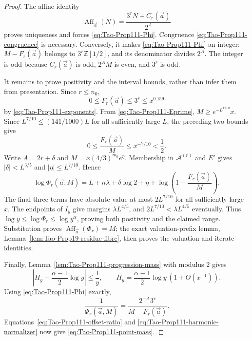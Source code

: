 \begin{proof}
The affine identity
\[
 \operatorname{Aff}_{\vec a}(N)=\frac{3^rN+C_r(\vec a)}{2^A}
\]
proves uniqueness and forces \eqref{eq:Tao-Prop111-Phi}.  Congruence
\eqref{eq:Tao-Prop111-congruence} is necessary.  Conversely, it makes
\eqref{eq:Tao-Prop111-Phi} an integer: \(M-F_r(\vec a)\) belongs to
\(3^r\mathbb Z[1/2]\), and its denominator divides \(2^A\).  The integer is
odd because \(C_r(\vec a)\) is odd, \(2^AM\) is even, and \(3^r\) is odd.

It remains to prove positivity and the interval bounds, rather than infer
them from presentation.  Since \(r\le n_0\),
\[
 0\le F_r(\vec a)\le3^r\le x^{0.159}
\]
by \eqref{eq:Tao-Prop111-exponents}.  From \eqref{eq:Tao-Prop111-Eprime},
\(M\ge e^{-L^{7/10}}x\).  Since
\(L^{7/10}\le(141/1000)L\) for all sufficiently large \(L\), the preceding
two bounds give
\begin{equation}
\label{eq:Tao-Prop111-offset-ratio}
 0\le\frac{F_r(\vec a)}M\le x^{-7/10}<\frac12.
\end{equation}
Write \(A=2r+\delta\) and
\(M=x(4/3)^{m_0}e^\eta\).  Membership in
\(\mathcal A^{(r)}\) and \(E'\) gives
\(|\delta|<L^{3/5}\) and \(|\eta|\le L^{7/10}\).  Hence
\begin{equation}
\label{eq:Tao-Prop111-Phi-log}
 \log\Phi_r(\vec a,M)
 =L+n\lambda+\delta\log2+\eta+
   \log\left(1-\frac{F_r(\vec a)}M\right).
\end{equation}
The final three terms have absolute value at most \(2L^{7/10}\) for all
sufficiently large \(x\).  The endpoints of \(I_y\) give margins
\(\lambda L^{4/5}\), and
\(2L^{7/10}<\lambda L^{4/5}\) eventually.  Thus
\(\log y\le\log\Phi_r\le\log y^\alpha\), proving both positivity and the
claimed range.  Substitution proves
\(\operatorname{Aff}_{\vec a}(\Phi_r)=M\); the exact valuation-prefix lemma,
Lemma~\ref{lem:Tao-Prop19-residue-fibre}, then proves the valuation and
iterate identities.

Finally, Lemma~\ref{lem:Tao-Prop111-progression-mass} with modulus \(2\)
gives
\begin{equation}
\label{eq:Tao-Prop111-harmonic-normalizer}
 \left|H_y-\frac{\alpha-1}{2}\log y\right|\le\frac1y,
 \qquad
 H_y=\frac{\alpha-1}{2}\log y\,(1+O(x^{-1})).
\end{equation}
Using \eqref{eq:Tao-Prop111-Phi} exactly,
\[
 \frac1{\Phi_r(\vec a,M)}
 =\frac{2^{-A}3^r}{M-F_r(\vec a)}.
\]
Equations~\eqref{eq:Tao-Prop111-offset-ratio} and
\eqref{eq:Tao-Prop111-harmonic-normalizer} now give
\eqref{eq:Tao-Prop111-point-mass}.
\end{proof}


